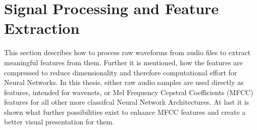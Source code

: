 
\chapter{Signal Processing and Feature Extraction}\label{sec:signal}
This section describes how to process raw waveforms from audio files to extract meaningful features from them.
Further it is mentioned, how the features are compressed to reduce dimensionality and therefore computational effort for Neural Networks.
In this thesis, either raw audio samples are used directly as features, intended for wavenets, or Mel Frequency Cepstral Coefficients (MFCC) features for all other more classifcal Neural Network Architectures.
At last it is shown what further possibilities exist to enhance MFCC features and create a better visual presentation for them.




